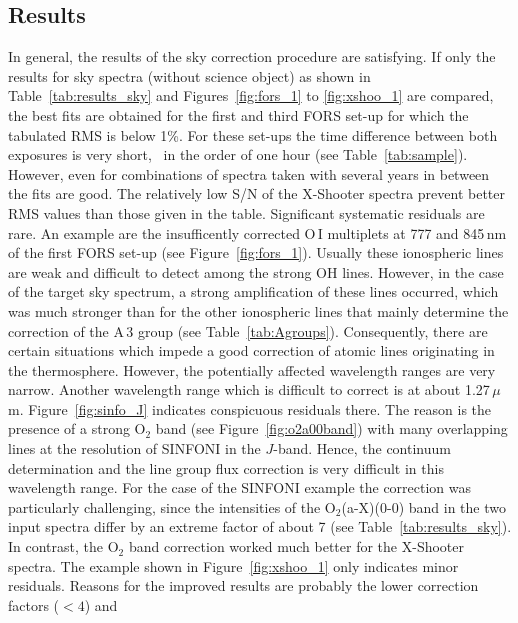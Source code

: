 \subsection{Results}\label{sec:results}
In general, the results of the sky correction procedure are satisfying. If only
the results for sky spectra (without science object) as shown in
Table~\ref{tab:results_sky} and Figures~\ref{fig:fors_1} to \ref{fig:xshoo_1}
are compared, the best fits are obtained for the first and third FORS set-up
for which the tabulated RMS is below 1\%. For these set-ups the time
difference between both exposures is very short, \ie\ in the order of one hour
(see Table~\ref{tab:sample}). However, even for combinations of spectra taken
with several years in between the fits are good. The relatively low
S/N of the X-Shooter spectra prevent better RMS values than those given in
the table. Significant systematic residuals are rare. An example are the
insufficently corrected O\,I multiplets at 777 and 845\,nm of the first FORS
set-up (see Figure~\ref{fig:fors_1}). Usually these ionospheric lines are weak
and difficult to detect among the strong OH lines. However, in the case of the
target sky spectrum, a strong amplification of these lines occurred, which was
much stronger than for the other ionospheric lines that mainly determine the
correction of the A\,3 group (see Table~\ref{tab:Agroups}). Consequently, there
are certain situations which impede a good correction of atomic lines
originating in the thermosphere. However, the potentially affected wavelength
ranges are very narrow. Another wavelength range which is difficult to correct
is at about 1.27\,$\mu$m. Figure~\ref{fig:sinfo_J} indicates conspicuous
residuals there. The reason is the presence of a strong O$_2$ band (see
Figure~\ref{fig:o2a00band}) with many overlapping lines at the resolution of
SINFONI in the $J$-band. Hence, the continuum determination and the line group
flux correction is very difficult in this wavelength range. For the case of the
SINFONI example the correction was particularly challenging, since the
intensities of the O$_2$(a-X)(0-0) band in the two input spectra differ by an
extreme factor of about 7 (see Table~\ref{tab:results_sky}). In contrast, the
O$_2$ band correction worked much better for the X-Shooter spectra. The example
shown in Figure~\ref{fig:xshoo_1} only indicates minor residuals. Reasons for
the improved results are probably the lower correction factors ($< 4$) and
